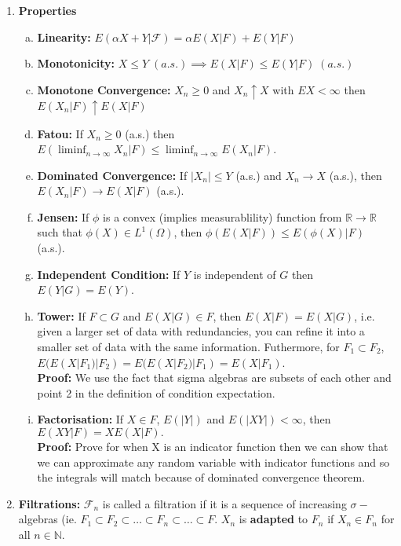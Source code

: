 \documentclass{article}
\begin{document}
\begin{enumerate}
    \item \textbf{Properties}
    \begin{enumerate} [a.]
        \item \textbf{Linearity:} \(E(\alpha X + Y|\mathcal{F}) = \alpha E(X|F) + E(Y|F)\)
        \item \textbf{Monotonicity:} \(X\leq Y \;(a.s.)
        \implies E(X|F) \leq E(Y|F) \; (a.s.)\)
        \item \textbf{Monotone Convergence:} \(X_n \geq 0\) and \(X_n \uparrow X\) with \(E X < \infty\) then \(E(X_n|F) \uparrow E(X|F)\)
        \item \textbf{Fatou:} If \(X_n \geq 0\) (a.s.) then \(E(\liminf_{n\to\infty} X_n|F) \leq \liminf_{n\to\infty} E(X_n|F)\).
        \item \textbf{Dominated Convergence:} If \(|X_n|\leq Y\) (a.s.) and \(X_n \to X\) (a.s.), then \(E(X_n|F) \to E(X|F)\) (a.s.).
        \item \textbf{Jensen:} If \(\phi\) is a convex (implies measurablility) function from \(\mathbb{R} \to \mathbb{R}\) such that \(\phi(X) \in L^1(\Omega)\), then \(\phi(E(X|F)) \leq E(\phi(X)|F)\) (a.s.).
        \item \textbf{Independent Condition:} If \(Y\) is independent of \(G\) then \(E(Y|G) = E(Y)\).
        \item \textbf{Tower:} If \(F \subset G\) and \(E(X|G) \in F\), then \(E(X|F) = E(X|G)\), i.e. given a larger set of data with redundancies, you can refine it into a smaller set of data with the same information. Futhermore, for \(F_1 \subset F_2\), \(E(E(X|F_1)|F_2) = E(E(X|F_2)|F_1) = E(X|F_1)\).\\
        \textbf{Proof:} We use the fact that sigma algebras are subsets of each other and point 2 in the definition of condition expectation.
        \item \textbf{Factorisation:} If \(X \in F\), \(E(|Y|)\) and \(E(|XY|) < \infty\), then \(E(XY|F) = X E(X|F).\)\\
        \textbf{Proof:} Prove for when X is an indicator function then we can show that we can approximate any random variable with indicator functions and so the integrals will match because of dominated convergence theorem.
        \end{enumerate}
    \item \textbf{Filtrations:} \(\mathcal{F}_n\) is called a filtration if it is a sequence of increasing \(\sigma-\)algebras (ie. \(F_1 \subset F_2 \subset \dots \subset F_n \subset \dots \subset F\). \(X_n\) is \textbf{adapted} to \(F_n\) if \(X_n \in F_n\) for all \(n \in \mathbb{N}\). 

\end{enumerate}
\end{document}
